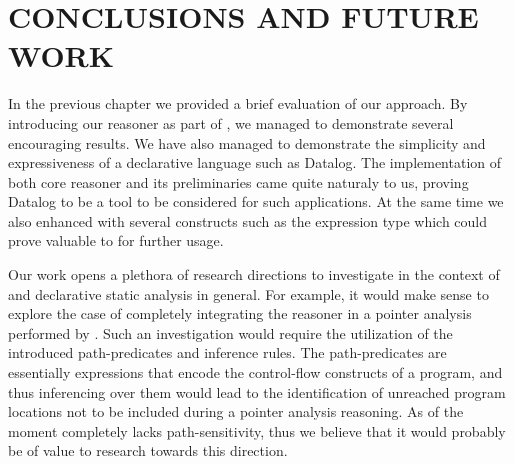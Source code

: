 \chapter{CONCLUSIONS AND FUTURE WORK}\label{c:conclusions}

In the previous chapter we provided a brief evaluation of our
approach. By introducing our reasoner as part of \doop{}, we
managed to demonstrate several encouraging results. We have also
managed to demonstrate the simplicity and expressiveness of
a declarative language such as Datalog. The implementation
of both core reasoner and its preliminaries came quite naturaly
to us, proving Datalog to be a tool to be considered for such
applications. At the same time we also enhanced \doop{} with
several constructs such as the expression type which could
prove valuable to \doop{} for further usage.

Our work opens a plethora of research directions to investigate
in the context of \doop{} and declarative static analysis in
general. For example, it would make sense to explore the case
of completely integrating the reasoner in a pointer analysis
performed by \doop{}. Such an investigation would require the
utilization of the introduced path-predicates and inference
rules. The path-predicates are essentially expressions that
encode the control-flow constructs of a program, and thus
inferencing over them would lead to the identification of
unreached program locations not to be included during a
pointer analysis reasoning. As of the moment \doop{} completely
lacks path-sensitivity, thus we believe that it would probably
be of value to research towards this direction.
